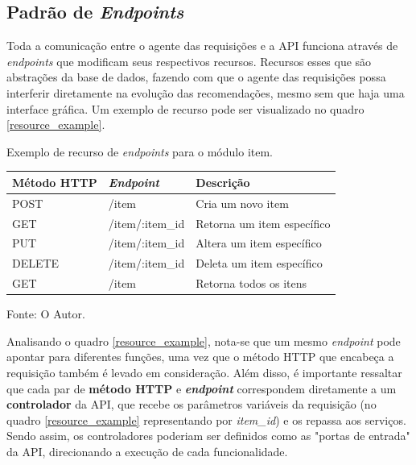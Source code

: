 \documentclass[12pt, openright, oneside, a4paper, brazil]{abntex2}
\begin{document}
\subsection{Padrão de \textit{Endpoints}} \label{endpoints}

Toda a comunicação entre o agente das requisições e a API funciona através de \textit{endpoints} que modificam seus respectivos recursos. Recursos esses que são abstrações da base de dados, fazendo com que o agente das requisições possa interferir diretamente na evolução das recomendações, mesmo sem que haja uma interface gráfica. Um exemplo de recurso pode ser visualizado no quadro \ref{resource_example}.

\begin{quadro}[h!tp]

	\caption{\label{resource_example}Exemplo de recurso de \textit{endpoints} para o módulo item.}
	\centering
	\begin{tabular}{|l|l|l|}
	\hline
	\textbf{Método HTTP} & \textit{\textbf{Endpoint}} & \textbf{Descrição}          \\ \hline
	POST                 & /item                      & Cria um novo item           \\ \hline
	GET                  & /item/:item\_id 			  & Retorna um item específico  \\ \hline
	PUT                  & /item/:item\_id            & Altera um item específico   \\ \hline
	DELETE               & /item/:item\_id            & Deleta um item específico   \\ \hline
	GET                  & /item                      & Retorna todos os itens      \\ \hline
	\end{tabular}

	Fonte: O Autor.

\end{quadro}

Analisando o quadro \ref{resource_example}, nota-se que um mesmo \textit{endpoint} pode apontar para diferentes funções, uma vez que o método HTTP que encabeça a requisição também é levado em consideração. Além disso, é importante ressaltar que cada par de \textbf{método HTTP} e \textbf{\textit{endpoint}} correspondem diretamente a um \textbf{controlador} da API, que recebe os parâmetros variáveis da requisição (no quadro \ref{resource_example} representando por \textit{item\_id}) e os repassa aos serviços. Sendo assim, os controladores poderiam ser definidos como as "portas de entrada" da API, direcionando a execução de cada funcionalidade.
\end{document}
